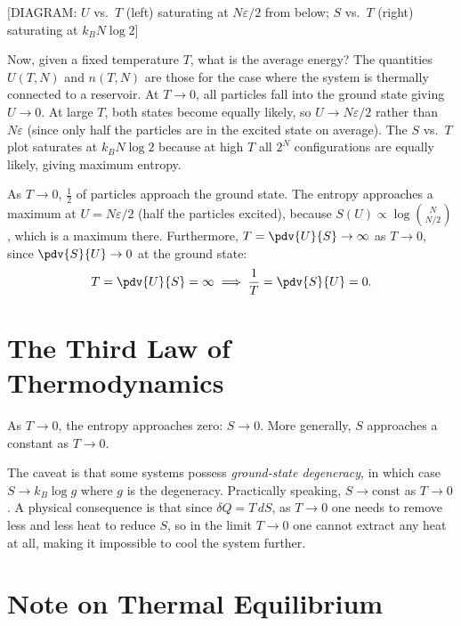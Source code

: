 \begin{center}[DIAGRAM: $U$ vs.\ $T$ (left) saturating at $N\varepsilon/2$ from below; $S$ vs.\ $T$ (right) saturating at $k_B N\log 2$]\end{center}

Now, given a fixed temperature $T$, what is the average energy? The quantities $U(T,N)$ and $n(T,N)$ are those for the case where the system is thermally connected to a reservoir. At $T \to 0$, all particles fall into the ground state giving $U\to 0$. At large $T$, both states become equally likely, so $U \to N\varepsilon/2$ rather than $N\varepsilon$ (since only half the particles are in the excited state on average). The $S$ vs.\ $T$ plot saturates at $k_B N\log 2$ because at high $T$ all $2^N$ configurations are equally likely, giving maximum entropy.

As $T\to 0$, $\frac{1}{2}$ of particles approach the ground state. The entropy approaches a maximum at $U = N\varepsilon/2$ (half the particles excited), because $S(U) \propto \log\binom{N}{N/2}$, which is a maximum there. Furthermore, $T = \pdv{U}{S} \to \infty$ as $T\to 0$, since $\pdv{S}{U}\to 0$ at the ground state:
\begin{equation}
    T = \pdv{U}{S} = \infty \implies \frac{1}{T} = \pdv{S}{U} = 0.
\end{equation}

\section{The Third Law of Thermodynamics}

\begin{theorem}
As $T \to 0$, the entropy approaches zero: $S \to 0$. More generally, $S$ approaches a constant as $T\to 0$.
\end{theorem}

The caveat is that some systems possess \emph{ground-state degeneracy}, in which case $S\to k_B \log g$ where $g$ is the degeneracy. Practically speaking, $S\to\text{const}$ as $T\to 0$. A physical consequence is that since $\delta Q = T\,dS$, as $T\to 0$ one needs to remove less and less heat to reduce $S$, so in the limit $T\to 0$ one cannot extract any heat at all, making it impossible to cool the system further.

\section{Note on Thermal Equilibrium}

